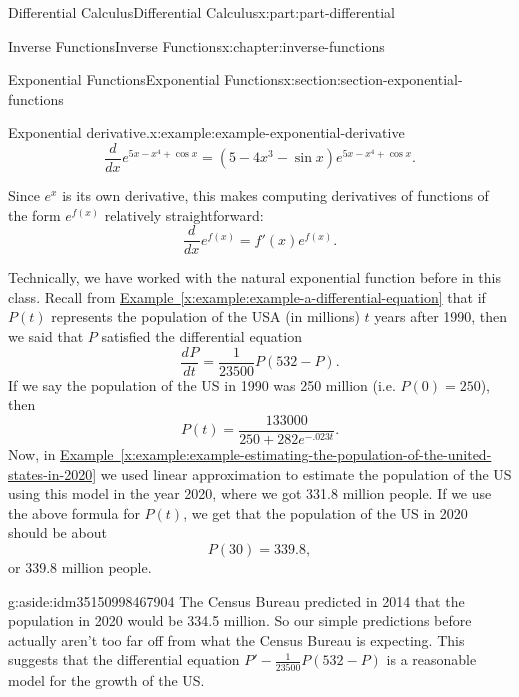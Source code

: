 \documentclass[twoside,10pt,]{tufte-book}
\newcommand{\xreffont}{\relax}
\numberwithin{equation}{part}
\newcommand{\dv}[3][]{\dfrac{d^{#1} #2}{d #3^{#1}}}
\begin{document}
\begin{partptx}{Differential Calculus}{}{Differential Calculus}{}{}{x:part:part-differential}
\begin{chapterptx}{Inverse Functions}{}{Inverse Functions}{}{}{x:chapter:inverse-functions}
\begin{sectionptx}{Exponential Functions}{}{Exponential Functions}{}{}{x:section:section-exponential-functions}
\begin{example}{Exponential derivative.}{x:example:example-exponential-derivative}
\begin{equation*}
\dv{}{x}e^{5x - x^{4} + \cos x} = (5 - 4x^{3} - \sin x)e^{5x - x^{4} + \cos x}.
\end{equation*}
%
\end{example}
Since \(e^{x}\) is its own derivative, this makes computing derivatives of functions of the form \(e^{f(x)}\) relatively straightforward:%
\begin{equation*}
\dv{}{x}e^{f(x)} = f'(x)e^{f(x)}.
\end{equation*}
%
\par
Technically, we have worked with the natural exponential function before in this class. Recall from \hyperref[x:example:example-a-differential-equation]{Example~{\xreffont\ref{x:example:example-a-differential-equation}}} that if \(P(t)\) represents the population of the USA (in millions) \(t\) years after 1990, then we said that \(P\) satisfied the differential equation%
\begin{equation*}
\dv{P}{t} = \frac{1}{23500}P(532 - P).
\end{equation*}
If we say the population of the US in 1990 was 250 million (i.e. \(P(0) = 250\)), then%
\begin{equation*}
P(t) = \frac{133000}{250 + 282e^{-.023t}}.
\end{equation*}
Now, in \hyperref[x:example:example-estimating-the-population-of-the-united-states-in-2020]{Example~{\xreffont\ref{x:example:example-estimating-the-population-of-the-united-states-in-2020}}} we used linear approximation to estimate the population of the US using this model in the year 2020, where we got 331.8 million people. If we use the above formula for \(P(t)\), we get that the population of the US in 2020 should be about%
\begin{equation*}
P(30) = 339.8,
\end{equation*}
or 339.8 million people.%
\begin{aside}{}{g:aside:idm35150998467904}%
The Census Bureau predicted in 2014 that the population in 2020 would be 334.5 million. So our simple predictions before actually aren't too far off from what the Census Bureau is expecting. This suggests that the differential equation \(P' - \frac{1}{23500}P(532-P)\) is a reasonable model for the growth of the US.%
\end{aside}
\end{sectionptx}
%
%
\typeout{************************************************}
\typeout{************************************************}

\end{chapterptx}
\end{partptx}
\end{document}
